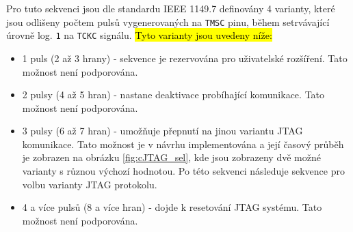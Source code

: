 Pro tuto sekvenci jsou dle standardu IEEE 1149.7 definovány 4 varianty, které jsou odlišeny počtem pulsů vygenerovaných na \texttt{\acs{TMSC}} pinu, během setrvávající úrovně log. \texttt{1} na \texttt{\acs{TCKC}} signálu. \hl{Tyto varianty jsou uvedeny níže:}

\begin{itemize}
	\item 1 puls (2 až 3 hrany) - sekvence je rezervována pro uživatelské rozšíření. Tato možnost není podporována.
	\item 2 pulsy (4 až 5 hran) - nastane deaktivace probíhající komunikace. Tato možnost není podporována.
	\item 3 pulsy (6 až 7 hran) - umožňuje přepnutí na jinou variantu \acs{JTAG} komunikace. Tato možnost je v návrhu implementována a její časový průběh je zobrazen na obrázku \ref{fig:cJTAG_sel}, kde jsou zobrazeny dvě možné varianty s různou výchozí hodnotou. Po této sekvenci následuje sekvence pro volbu varianty \acs{JTAG} protokolu.
	\item 4 a více pulsů (8 a více hran) - dojde k resetování \acs{JTAG} systému. Tato možnost není podporována.
\end{itemize}




